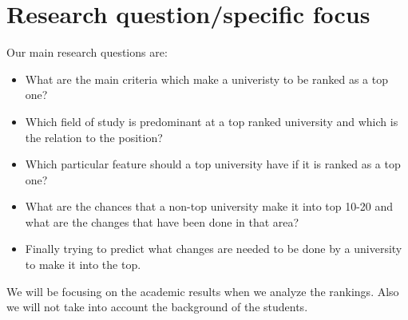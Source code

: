 \section{Research question/specific focus}
Our main research questions are:
\begin{itemize}
	\item What are the main criteria which make a univeristy to be ranked as a top one?
	\item Which field of study is predominant at a top ranked university and which is the relation to the position?
	\item Which particular feature should a top university have if it is ranked as a top one?
	\item What are the chances that a non-top university make it into top 10-20 and what are the changes that have been done in that area?
	\item Finally trying to predict what changes are needed to be done by a university to make it into the top.
\end{itemize}

We will be focusing on the academic results when we analyze the rankings. Also we will not take into account the background of the students.